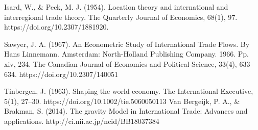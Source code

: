 \documentclass[12pt, letterpaper, twoside]{article}
\begin{document}

\pagebreak

\begin{thebibliography}{9}
Isard, W., & Peck, M. J. (1954). Location theory and international and interregional trade theory. The Quarterly Journal of Economics, 68(1), 97. https://doi.org/10.2307/1881920.

Sawyer, J. A. (1967). An Econometric Study of International Trade Flows. By Hans Linnemann. Amsterdam: North-Holland Publishing Company. 1966. Pp. xiv, 234. The Canadian Journal of Economics and Political Science, 33(4), 633–634. https://doi.org/10.2307/140051

Tinbergen, J. (1963). Shaping the world economy. The International Executive, 5(1), 27–30. https://doi.org/10.1002/tie.5060050113
Van Bergeijk, P. A., & Brakman, S. (2014). The gravity Model in International Trade: Advances and applications. http://ci.nii.ac.jp/ncid/BB18037384


\end{thebibliography}
\end{document}
